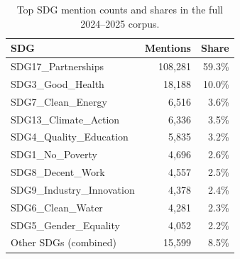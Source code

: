 \begin{table}[H]
\centering
\caption{Top SDG mention counts and shares in the full 2024--2025 corpus.}
\label{tab:sdg_counts_full}
\begin{tabular}{lrr}
\toprule
SDG & Mentions & Share \\
\midrule
SDG17\_Partnerships & 108,281 & 59.3\% \\
SDG3\_Good\_Health & 18,188 & 10.0\% \\
SDG7\_Clean\_Energy & 6,516 & 3.6\% \\
SDG13\_Climate\_Action & 6,336 & 3.5\% \\
SDG4\_Quality\_Education & 5,835 & 3.2\% \\
SDG1\_No\_Poverty & 4,696 & 2.6\% \\
SDG8\_Decent\_Work & 4,557 & 2.5\% \\
SDG9\_Industry\_Innovation & 4,378 & 2.4\% \\
SDG6\_Clean\_Water & 4,281 & 2.3\% \\
SDG5\_Gender\_Equality & 4,052 & 2.2\% \\
Other SDGs (combined) & 15,599 & 8.5\% \\
\bottomrule
\end{tabular}
\end{table}
